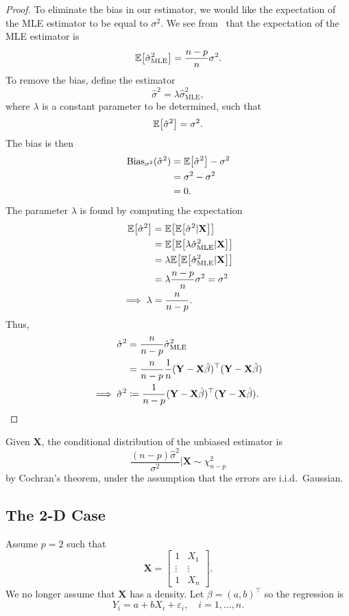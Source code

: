 \documentclass[letterpaper, reqno]{amsart}
\numberwithin{equation}{section}
\newcommand{\T}{\top} %
\newcommand{\vect}[1]{\boldsymbol{\mathbf{#1}}} %
\newcommand{\E}[1]{\mathbb{E}\mleft[#1\mright]}
\newcommand{\iid}{i.i.d.}
\newcommand{\Xm}{\vect{X}}
\newcommand{\Yv}{\vect{Y}}
\newcommand{\Bv}{\beta}
\newcommand{\Bvh}{\hat{\beta}}
\newcommand{\ve}{\varepsilon}
\begin{document}
\begin{proof}
  To eliminate the bias in our estimator, we would like the expectation of the MLE
  estimator to be equal to $\sigma^2$. We see from~ that the
  expectation of the MLE estimator is
  \[ \E{\hat{\sigma}^2_\mathrm{MLE}} = \frac{n-p}{n} \sigma^2. \]
  To remove the bias, define the estimator
  \[ \hat{\sigma}^2 = \lambda \hat{\sigma}^2_\mathrm{MLE}, \]
  where $\lambda$ is a constant parameter to be determined, such that
  \[ \E{\hat{\sigma}^2} = \sigma^2. \]
  The bias is then
  \begin{align*}
    \mathrm{Bias}_{\sigma^2}(\hat{\sigma}^2) &= \E{\hat{\sigma}^2} - \sigma^2 \\
    &= \sigma^2 - \sigma^2 \\
    &= 0.
  \end{align*}
  The parameter $\lambda$ is found by computing the expectation
  \begin{align*}
    \E{\hat{\sigma}^2} &= \E{\E{\hat{\sigma}^2 | \Xm}} \\
    &= \E{\E{\lambda \hat{\sigma}^2_\mathrm{MLE} | \Xm}} \\
    &= \lambda \E{\E{\hat{\sigma}^2_\mathrm{MLE} | \Xm}} \\
    &= \lambda \frac{n-p}{n} \sigma^2 = \sigma^2 \\
    \implies \lambda &= \frac{n}{n-p}.
  \end{align*}
  Thus,
  \begin{align*}
    \hat{\sigma}^2 &= \frac{n}{n-p} \hat{\sigma}^2_\mathrm{MLE} \\
    &= \frac{n}{n-p} \frac{1}{n}(\Yv - \Xm\Bvh)^\T(\Yv - \Xm\Bvh) \\
  \implies \hat{\sigma}^2  &\coloneqq \frac{1}{n-p} (\Yv - \Xm\Bvh)^\T(\Yv - \Xm\Bvh). \qedhere
  \end{align*}
\end{proof}

Given $\Xm$, the conditional distribution of the unbiased estimator is
\[ \frac{(n-p)\hat{\sigma}^2}{\sigma^2} \Big| \Xm \sim \chi^2_{n-p} \]
by Cochran's theorem, under the assumption that the errors are \iid\ Gaussian.

\subsection{The 2-D Case}
Assume $p = 2$ such that 
\begin{equation} \label{eq:Xm}
   \Xm = \begin{bmatrix} 1 & X_1 \\ \vdots & \vdots \\ 1 & X_n \end{bmatrix}.
\end{equation}
We no longer assume that $\Xm$ has a density. %
Let $\Bv = (a, b)^\T$ so the regression is
\[ Y_i = a + bX_i + \ve_i, \quad i = 1, \dots, n. \]
\end{document}
